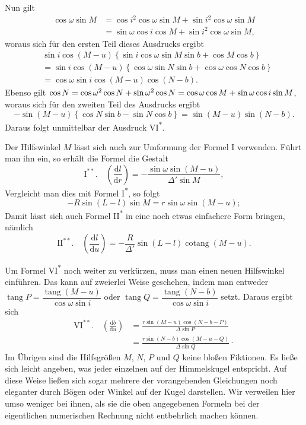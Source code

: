 \noindent Nun gilt
\[
\begin{aligned}
\cos\omega\sin M&=\allowbreak \cos i^2\cos\omega\sin M +\allowbreak \sin i^2\cos\omega\sin M\\
&=\allowbreak \sin\omega\cos i\cos M +\allowbreak \sin i^2\cos\omega\sin M,
\end{aligned}
\]
woraus sich für den ersten Teil dieses Ausdrucks ergibt
\[
\begin{aligned}
&\sin i\cos(M-u)\left\{\sin i\cos\omega\sin M\sin b + \cos M\cos b\right\}\\
&= \sin i\cos(M-u)\left\{\cos\omega\sin N\sin b + \cos\omega\cos N\cos b\right\}\\
&= \cos\omega\sin i\cos(M-u)\cos(N-b).
\end{aligned}
\]
\noindent Ebenso gilt $\cos N =\allowbreak \cos\omega^2\cos N +\allowbreak \sin\omega^2\cos N =\hfil\penalty-10000 \cos\omega\cos M +\allowbreak \sin\omega\cos i\sin M$, woraus sich für den zweiten Teil des Ausdrucks ergibt
\[
-\sin(M-u)\left\{\cos N\sin b - \sin N\cos b\right\} = \sin(M-u)\sin(N-b).
\]
\noindent Daraus folgt unmittelbar der Ausdruck VI\textsuperscript{*}.

Der Hilfswinkel $M$ lässt sich auch zur Umformung der Formel I verwenden. Führt man ihn ein, so erhält die Formel die Gestalt
\[
\mathrm{I}^{**}.\quad \left(\frac{\mathrm{d}l}{\mathrm{d}r}\right) = -\frac{\sin\omega\sin(M-u)}{\Delta'\sin M},
\]
\noindent Vergleicht man dies mit Formel I\textsuperscript{*}, so folgt
\[
-R\sin(L-l)\sin M = r\sin\omega\sin(M-u);
\]
\noindent Damit lässt sich auch Formel II\textsuperscript{*} in eine noch etwas einfachere Form bringen, nämlich
\[
\mathrm{II}^{**}.\quad \left(\frac{\mathrm{d}l}{\mathrm{d}u}\right) = -\frac{R}{\Delta'}\sin(L-l)\operatorname{cotang}(M-u).
\]

Um Formel VI\textsuperscript{*} noch weiter zu verkürzen, muss man einen neuen Hilfswinkel einführen. Das kann auf zweierlei Weise geschehen, indem man entweder $\operatorname{tang}P=\dfrac{\operatorname{tang}(M-u)}{\cos\omega\sin i}$ oder $\operatorname{tang}Q=\dfrac{\operatorname{tang}(N-b)}{\cos\omega\sin i}$ setzt. Daraus ergibt sich
\[
\begin{aligned}
\mathrm{VI}^{**}.\quad \left(\frac{\mathrm{d}b}{\mathrm{d}u}\right) &= \frac{r\sin(M-u)\cos(N-b-P)}{\Delta\sin P}\\
& = \frac{r\sin(N-b)\cos(M-u-Q)}{\Delta\sin Q}\mathpunct{\cdot}
\end{aligned}
\]
\noindent Im Übrigen sind die Hilfsgrößen $M$, $N$, $P$ und $Q$ keine bloßen Fiktionen. Es ließe sich leicht angeben, was jeder einzelnen auf der Himmelskugel entspricht. Auf diese Weise ließen sich sogar mehrere der vorangehenden Gleichungen noch eleganter durch Bögen oder Winkel auf der Kugel darstellen. Wir verweilen hier umso weniger bei ihnen, als sie die oben angegebenen Formeln bei der eigentlichen numerischen Rechnung nicht entbehrlich machen können.

